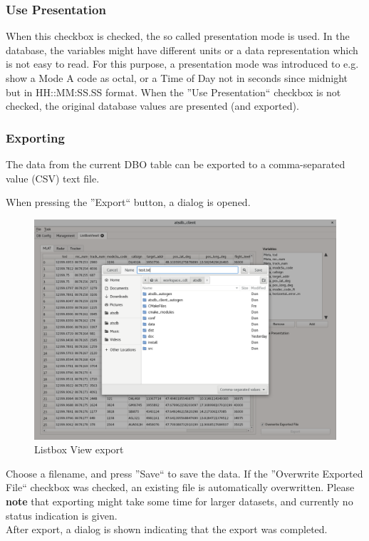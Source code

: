 \documentclass[10pt,letterpaper,extrafontsizes]{memoir}
\begin{document}
\subsubsection{Use Presentation}
When this checkbox is checked, the so called presentation mode is used. In the database, the variables might have different units or a data representation which is not easy to read. For this purpose, a presentation mode was introduced to e.g. show a Mode A code as octal, or a Time of Day not in seconds since midnight but in HH::MM:SS.SS format. When the ''Use Presentation`` checkbox is not checked, the original database values are presented (and exported).

\subsubsection{Exporting}

The data from the current DBO table can be exported to a comma-separated value (CSV) text file. 

When pressing the ''Export`` button, a dialog is opened.

\begin{figure}[H]
    \hspace*{-2cm}
    \includegraphics[width=18cm,frame]{../screenshots/listbox_export.png}
  \caption{Listbox View export}
  \label{fig:listbox_export}
\end{figure}

Choose a filename, and press ''Save`` to save the data. If the ''Overwrite Exported File`` checkbox was checked, an existing file is automatically overwritten. Please \textbf{note} that exporting might take some time for larger datasets, and currently no status indication is given.\\
After export, a dialog is shown indicating that the export was completed.
\end{document}
